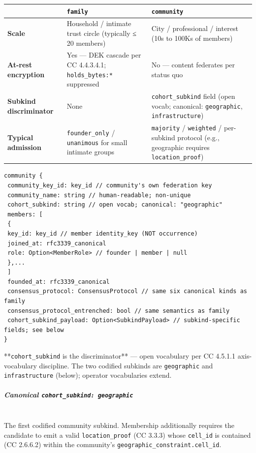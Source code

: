 \documentclass[11pt]{article}
\begin{document}
{\footnotesize
\begin{longtable}{|p{5.33cm}|p{5.33cm}|p{5.33cm}|}\hline
\textbf{} & \textbf{\texttt{family}} & \textbf{\texttt{community}} \\ \hline\endhead
\textbf{Scale} & Household / intimate trust circle (typically ≤ 20 members) & City / professional / interest (10s to 100Ks of members) \\ \hline
\textbf{At-rest encryption} & Yes — DEK cascade per CC 4.4.3.4.1; \texttt{holds\_bytes:*} suppressed & No — content federates per status quo \\ \hline
\textbf{Subkind discriminator} & None & \texttt{cohort\_subkind} field (open vocab; canonical: \texttt{geographic}, \texttt{infrastructure}) \\ \hline
\textbf{Typical admission} & \texttt{founder\_only} / \texttt{unanimous} for small intimate groups & \texttt{majority} / \texttt{weighted} / per-subkind protocol (e.g., geographic requires \texttt{location\_proof}) \\ \hline
\end{longtable}}


\begin{lstlisting}
community {
 community_key_id: key_id // community's own federation key
 community_name: string // human-readable; non-unique
 cohort_subkind: string // open vocab; canonical: "geographic"
 members: [
 {
 key_id: key_id // member identity_key (NOT occurrence)
 joined_at: rfc3339_canonical
 role: Option<MemberRole> // founder | member | null
 },...
 ]
 founded_at: rfc3339_canonical
 consensus_protocol: ConsensusProtocol // same six canonical kinds as family
 consensus_protocol_entrenched: bool // same semantics as family
 cohort_subkind_payload: Option<SubkindPayload> // subkind-specific fields; see below
}
\end{lstlisting}

**\texttt{cohort\_subkind} is the discriminator** — open vocabulary per CC 4.5.1.1 axis-vocabulary discipline. The two codified subkinds are \texttt{geographic} and \texttt{infrastructure} (below); operator vocabularies extend.


\subparagraph{Canonical \texttt{cohort\_subkind: geographic}}\mbox{}\\


The first codified community subkind. Membership additionally requires the candidate to emit a valid \texttt{location\_proof} (CC 3.3.3) whose \texttt{cell\_id} is contained (CC 2.6.6.2) within the community's \texttt{geographic\_constraint.cell\_id}.
\end{document}
